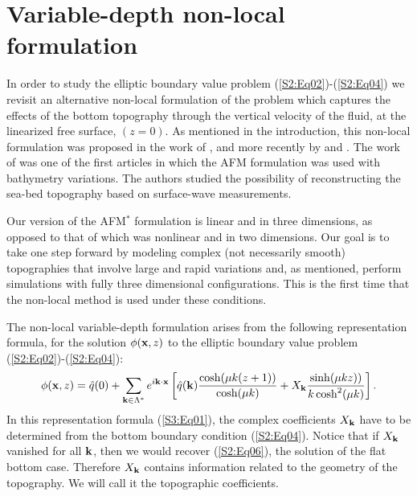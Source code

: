\section{Variable-depth non-local formulation}

In order to study the elliptic boundary value problem (\ref{S2:Eq02})-(\ref{S2:Eq04}) we revisit an alternative non-local formulation of the problem which captures the effects of the bottom topography through the vertical velocity of the fluid, at the linearized free surface, $(z=0)$. As mentioned in the introduction, this non-local formulation was proposed in the work of \citet{Paul1998}, and more recently by \citet{CSNG} and \citet{AFM}.
The work of \citet{VasanDeconinck} was one of the first articles in which the AFM formulation was used with 
bathymetry variations. The authors studied the possibility of reconstructing the sea-bed topography  
based on surface-wave measurements.

Our version of the AFM$^\ast$ formulation is linear and in three dimensions, as opposed to that of \citet{VasanDeconinck}  
which was nonlinear and in two dimensions. Our goal is to take one step forward by 
modeling complex (not necessarily smooth) topographies that involve large and rapid variations and, as mentioned, 
perform simulations with fully three dimensional configurations. 
This is the first time that the non-local method is used under these conditions.


The non-local variable-depth formulation arises from the following representation formula, for the solution $\phi(\bold{x},z)$ to the elliptic boundary value problem (\ref{S2:Eq02})-(\ref{S2:Eq04}):
\begin{equation}\label{S3:Eq01}
\phi(\bold{x},z) = \hat{q}(0) + \sum_{\bold{k}\in\Lambda^*}e^{i\bold{k}\cdot\bold{x}}\left[\hat{q}(\bold{k})\frac{\cosh(\mu k(z+1))}{\cosh(\mu k)} + X_{\bold{k}}\frac{\sinh(\mu kz))}{k\cosh^2(\mu k)}\right].
\end{equation}
 In this representation formula (\ref{S3:Eq01}), the complex coefficients $X_{\bold{k}}$ have to be determined from 
 the bottom boundary condition (\ref{S2:Eq04}). 
 Notice that if $X_{\bold{k}}$ vanished for all $\bold{k}$, then we would recover (\ref{S2:Eq06}), the solution of the flat bottom case. 
 Therefore $X_{\bold{k}}$ contains  information related to the geometry of the topography. We will call it the topographic coefficients.

